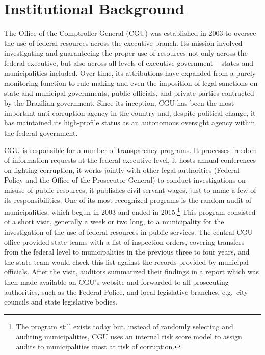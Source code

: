 \documentclass[11pt]{article}
\begin{document}
\section{Institutional Background} \label{sec:background_paper3}

The Office of the Comptroller-General (CGU) was established in 2003 to oversee the use of federal resources across the executive branch. Its mission involved investigating and guaranteeing the proper use of resources not only across the federal executive, but also across all levels of executive government -- states and municipalities included. Over time, its attributions have expanded from a purely monitoring function to rule-making and even the imposition of legal sanctions on state and municipal governments, public officials, and private parties contracted by the Brazilian government. Since its inception, CGU has been the most important anti-corruption agency in the country and, despite political change, it has maintained its high-profile status as an autonomous oversight agency within the federal government.

CGU is responsible for a number of transparency programs. It processes freedom of information requests at the federal executive level, it hosts annual conferences on fighting corruption, it works jointly with other legal authorities (Federal Policy and the Office of the Prosecutor-General) to conduct investigations on misuse of public resources, it publishes civil servant wages, just to name a few of its responsibilities. One of its most recognized programs is the random audit of municipalities, which begun in 2003 and ended in 2015.\footnote{The program still exists today but, instead of randomly selecting and auditing municipalities, CGU uses an internal risk score model to assign audits to municipalities most at risk of corruption.} This program consisted of a short visit, generally a week or two long, to a municipality for the investigation of the use of federal resources in public services. The central CGU office provided state teams with a list of inspection orders, covering transfers from the federal level to municipalities in the previous three to four years, and the state team would check this list against the records provided by municipal officials. After the visit, auditors summarized their findings in a report which was then made available on CGU's website and forwarded to all prosecuting authorities, such as the Federal Police, and local legislative branches, e.g.~city councils and state legislative bodies.
\end{document}

